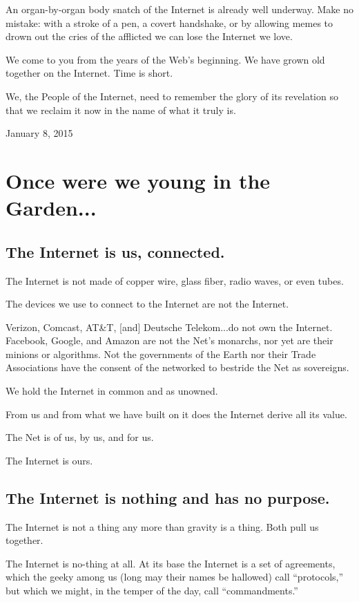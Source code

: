 \documentclass[letterpaper,12pt,english]{sphinxmanual}
\begin{document}
An organ-by-organ body snatch of the Internet is already well underway. Make no mistake: with a stroke of a pen, a covert handshake, or by allowing memes to drown out the cries of the afflicted we can lose the Internet we love.

We come to you from the years of the Web's beginning. We have grown old together on the Internet. Time is short.

We, the People of the Internet, need to remember the glory of its revelation so that we reclaim it now in the name of what it truly is.

January 8, 2015


\section{Once were we young in the Garden...}
\label{2015newclues:once-were-we-young-in-the-garden}

\subsection{The Internet is us, connected.}
\label{2015newclues:the-internet-is-us-connected}
The Internet is not made of copper wire, glass fiber, radio waves, or even tubes.

The devices we use to connect to the Internet are not the Internet.

Verizon, Comcast, AT\&T, {[}and{]} Deutsche Telekom...do not own the Internet. Facebook, Google, and Amazon are not the Net's monarchs, nor yet are their minions or algorithms. Not the governments of the Earth nor their Trade Associations have the consent of the networked to bestride the Net as sovereigns.

We hold the Internet in common and as unowned.

From us and from what we have built on it does the Internet derive all its value.

The Net is of us, by us, and for us.

The Internet is ours.


\subsection{The Internet is nothing and has no purpose.}
\label{2015newclues:the-internet-is-nothing-and-has-no-purpose}
The Internet is not a thing any more than gravity is a thing. Both pull us together.

The Internet is no-thing at all. At its base the Internet is a set of agreements, which the geeky among us (long may their names be hallowed) call ``protocols,'' but which we might, in the temper of the day, call ``commandments.''
\end{document}
